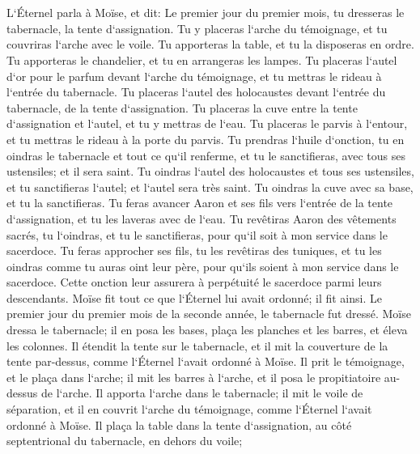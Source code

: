 \chapter{}

\verse L`Éternel parla à Moïse, et dit: 
\verse Le premier jour du premier mois, tu dresseras le tabernacle, la tente d`assignation. 
\verse Tu y placeras l`arche du témoignage, et tu couvriras l`arche avec le voile. 
\verse Tu apporteras la table, et tu la disposeras en ordre. Tu apporteras le chandelier, et tu en arrangeras les lampes. 
\verse Tu placeras l`autel d`or pour le parfum devant l`arche du témoignage, et tu mettras le rideau à l`entrée du tabernacle. 
\verse Tu placeras l`autel des holocaustes devant l`entrée du tabernacle, de la tente d`assignation. 
\verse Tu placeras la cuve entre la tente d`assignation et l`autel, et tu y mettras de l`eau. 
\verse Tu placeras le parvis à l`entour, et tu mettras le rideau à la porte du parvis. 
\verse Tu prendras l`huile d`onction, tu en oindras le tabernacle et tout ce qu`il renferme, et tu le sanctifieras, avec tous ses ustensiles; et il sera saint. 
\verse Tu oindras l`autel des holocaustes et tous ses ustensiles, et tu sanctifieras l`autel; et l`autel sera très saint. 
\verse Tu oindras la cuve avec sa base, et tu la sanctifieras. 
\verse Tu feras avancer Aaron et ses fils vers l`entrée de la tente d`assignation, et tu les laveras avec de l`eau. 
\verse Tu revêtiras Aaron des vêtements sacrés, tu l`oindras, et tu le sanctifieras, pour qu`il soit à mon service dans le sacerdoce. 
\verse Tu feras approcher ses fils, tu les revêtiras des tuniques, 
\verse et tu les oindras comme tu auras oint leur père, pour qu`ils soient à mon service dans le sacerdoce. Cette onction leur assurera à perpétuité le sacerdoce parmi leurs descendants. 
\verse Moïse fit tout ce que l`Éternel lui avait ordonné; il fit ainsi. 
\verse Le premier jour du premier mois de la seconde année, le tabernacle fut dressé. 
\verse Moïse dressa le tabernacle; il en posa les bases, plaça les planches et les barres, et éleva les colonnes. 
\verse Il étendit la tente sur le tabernacle, et il mit la couverture de la tente par-dessus, comme l`Éternel l`avait ordonné à Moïse. 
\verse Il prit le témoignage, et le plaça dans l`arche; il mit les barres à l`arche, et il posa le propitiatoire au-dessus de l`arche. 
\verse Il apporta l`arche dans le tabernacle; il mit le voile de séparation, et il en couvrit l`arche du témoignage, comme l`Éternel l`avait ordonné à Moïse. 
\verse Il plaça la table dans la tente d`assignation, au côté septentrional du tabernacle, en dehors du voile; 

